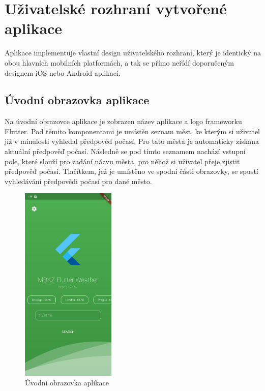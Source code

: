 \documentclass[12pt, a4paper]{article}
\let\oldsection\section
\renewcommand\section{\clearpage\oldsection}
\begin{document}
\section{Uživatelské rozhraní vytvořené aplikace}\label{chapt:ui}

Aplikace implementuje vlastní design uživatelského rozhraní, který je identický na obou hlavních mobilních platformách, a tak se přímo neřídí doporučeným designem iOS nebo Android aplikací.

\subsection{Úvodní obrazovka aplikace}

Na úvodní obrazovce aplikace je zobrazen název aplikace a logo frameworku Flutter. Pod těmito komponentami je umístěn seznam měst, ke kterým si uživatel již v minulosti vyhledal předpověd počasí. Pro tato města je automaticky získána aktuální předpověď počasí. Následně se pod tímto seznamem nachází vstupní pole, které slouží pro zadání názvu města, pro něhož si uživatel přeje zjistit předpověď počasí. Tlačítkem, jež je umístěno ve spodní části obrazovky, se spustí vyhledávání předpovědi počasí pro dané město.

\begin{figure}[h]
    \centering
    \includegraphics[width=0.40\textwidth]{img/app-menu.jpg}
    \caption{Úvodní obrazovka aplikace}
    \label{fig:mesh1}
\end{figure}
\end{document}
